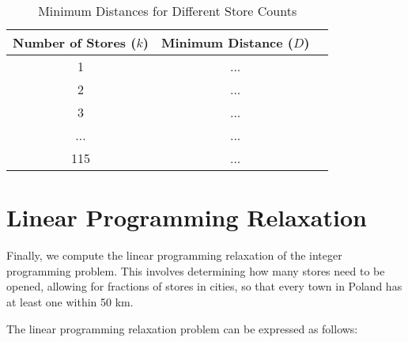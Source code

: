 \begin{table}[h]
\centering
\begin{tabular}{ccc}
\toprule
\textbf{Number of Stores ($k$)} & \textbf{Minimum Distance ($D$)} & \\
\midrule
1 & ... & \\
2 & ... & \\
3 & ... & \\
... & ... & \\
115 & ... & \\
\bottomrule
\end{tabular}
\caption{Minimum Distances for Different Store Counts}
\end{table}

\section*{ Linear Programming Relaxation}
Finally, we compute the linear programming relaxation of the integer programming problem. This involves determining how many stores need to be opened, allowing for fractions of stores in cities, so that every town in Poland has at least one within 50 km.

The linear programming relaxation problem can be expressed as follows:

